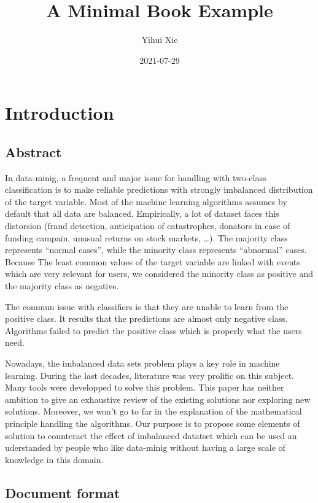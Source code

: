 \documentclass[
]{report}
\title{A Minimal Book Example}
\author{Yihui Xie}
\date{2021-07-29}
\begin{document}
\maketitle

{
\setcounter{tocdepth}{1}
\tableofcontents
}
\hypertarget{introduction}{%
\chapter{Introduction}\label{introduction}}

\hypertarget{abstract}{%
\section{Abstract}\label{abstract}}

In data-minig, a frequent and major issue for handling with two-class classification is to make reliable predictions with strongly imbalanced distribution of the target variable. Most of the machine learning algorithms assumes by default that all data are balanced. Empirically, a lot of dataset faces this distorsion (fraud detection, anticipation of catastrophes, donators in case of funding campain, unusual returns on stock markets, \ldots). The majority class represents ``normal cases'', while the minority class represents ``abnormal'' cases. Because The least common values of the target variable are linked with events which are very relevant for users, we considered the minority class as positive and the majority class as negative.

The commun issue with classifiers is that they are unable to learn from the positive class. It results that the predictions are almost only negative class. Algorithms failed to predict the positive class which is properly what the users need.

Nowadays, the imbalanced data sets problem plays a key role in machine learning. During the last decades, literature was very prolific on this subject. Many tools were developped to solve this problem. This paper has neither ambition to give an exhaustive review of the existing solutions nor exploring new solutions. Moreover, we won't go to far in the explanation of the mathematical principle handling the algorithms. Our purpose is to propose some elements of solution to counteract the effect of imbalanced datatset which can be used an uderstanded by people who like data-minig without having a large scale of knowledge in this domain.

\hypertarget{document-format}{%
\section{Document format}\label{document-format}}
\end{document}
